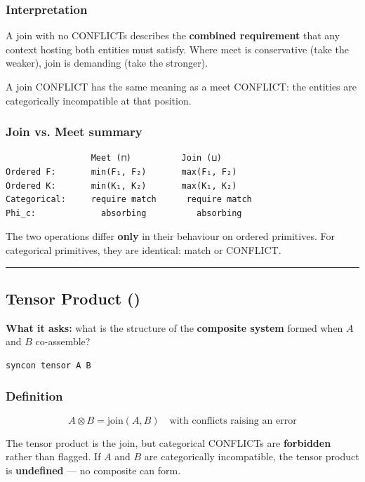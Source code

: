 \documentclass[11pt,a4paper]{article}
\begin{document}
\subsubsection{Interpretation}

A join with no CONFLICTs describes the \textbf{combined requirement} that any context hosting both entities must satisfy. Where meet is conservative (take the weaker), join is demanding (take the stronger).

A join CONFLICT has the same meaning as a meet CONFLICT: the entities are categorically incompatible at that position.

\subsubsection{Join vs. Meet summary}

\begin{lstlisting}
                 Meet (⊓)          Join (⊔)
Ordered F:       min(F₁, F₂)       max(F₁, F₂)
Ordered K:       min(K₁, K₂)       max(K₁, K₂)
Categorical:     require match      require match
Phi_c:             absorbing          absorbing
\end{lstlisting}

The two operations differ \textbf{only} in their behaviour on ordered primitives. For categorical primitives, they are identical: match or CONFLICT.

\begin{center}
\rule{0.5\textwidth}{0.4pt}
\end{center}

\subsection{Tensor Product (\otimes)}

\textbf{What it asks:} what is the structure of the \textbf{composite system} formed when $A$ and $B$ co-assemble?

\begin{lstlisting}
syncon tensor A B
\end{lstlisting}

\subsubsection{Definition}

\[A \otimes B = \text{join}(A, B) \quad \text{with conflicts raising an error}\]

The tensor product is the join, but categorical CONFLICTs are \textbf{forbidden} rather than flagged. If $A$ and $B$ are categorically incompatible, the tensor product is \textbf{undefined} --- no composite can form.
\end{document}
